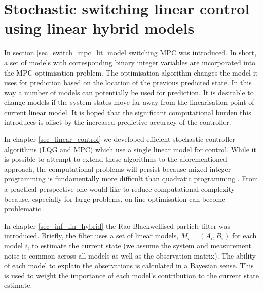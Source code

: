 \chapter{Stochastic switching linear control using linear hybrid models}
\label{sec_rbpf_control}
In section \ref{sec_switch_mpc_lit} model switching MPC was introduced. In short, a set of models with corresponding binary integer variables are incorporated into the MPC optimisation problem. The optimisation algorithm changes the model it uses for prediction based on the location of the previous predicted state. In this way a number of models can potentially be used for prediction. It is desirable to change models if the system states move far away from the linearisation point of current linear model. It is hoped that the significant computational burden this introduces is offset by the increased predictive accuracy of the controller.

In chapter \ref{sec_linear_control} we developed efficient stochastic controller algorithms (LQG and MPC) which use a single linear model for control. While it is possible to attempt to extend these algorithms to the aforementioned approach, the computational problems will persist because mixed integer programming is fundamentally more difficult than quadratic programming \cite{forst}. From a practical perspective one would like to reduce computational complexity because, especially for large problems, on-line optimisation can become problematic.

In chapter \ref{sec_inf_lin_hybrid} the Rao-Blackwellised particle filter was introduced. Briefly, the filter uses a set of linear models, $M_i=(A_i, B_i)$ for each model $i$, to estimate the current state (we assume the system and measurement noise is common across all models as well as the observation matrix). The ability of each model to explain the observations is calculated in a Bayesian sense. This is used to weight the importance of each model's contribution to the current state estimate. 

